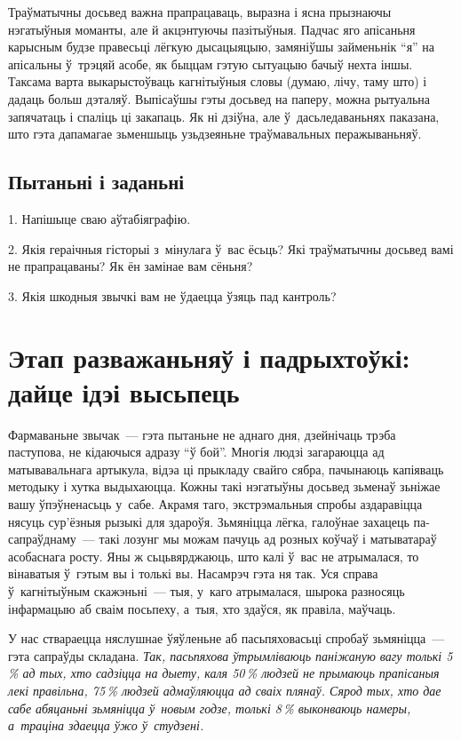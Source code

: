 Траўматычны досьвед важна прапрацаваць, выразна і ясна прызнаючы нэгатыўныя моманты, але й акцэнтуючы пазітыўныя. Падчас яго апісаньня карысным будзе правесьці лёгкую дысацыяцыю, замяніўшы займеньнік ``я'' на апісальны ў~трэцяй асобе, як быццам гэтую сытуацыю бачыў нехта іншы. Таксама варта выкарыстоўваць кагнітыўныя словы (думаю, лічу, таму што) і дадаць больш дэталяў. Выпісаўшы гэты досьвед на паперу, можна рытуальна запячатаць і спаліць ці закапаць. Як ні дзіўна, але ў~дасьледаваньнях паказана, што гэта дапамагае зьменшыць узьдзеяньне траўмавальных перажываньняў.

\subsection*{Пытаньні і заданьні}

1. Напішыце сваю аўтабіяграфію.

2. Якія гераічныя гісторыі з~мінулага ў~вас ёсьць? Які траўматычны досьвед вамі не прапрацаваны? Як ён замінае вам сёньня?

3. Якія шкодныя звычкі вам не ўдаецца ўзяць пад кантроль?


\section{Этап разважаньняў і падрыхтоўкі: дайце ідэі высьпець}

Фармаваньне звычак~--- гэта пытаньне не аднаго дня, дзейнічаць трэба паступова, не кідаючыся адразу ``ў бой''. Многія людзі загараюцца ад матывавальнага артыкула, відэа ці прыкладу свайго сябра, пачынаюць капіяваць методыку і хутка выдыхаюцца. Кожны такі нэгатыўны досьвед зьменаў зьніжае вашу ўпэўненасьць у~сабе. Акрамя таго, экстрэмальныя спробы аздаравіцца нясуць сур'ёзныя рызыкі для здароўя. Зьмяніцца лёгка, галоўнае захацець па-сапраўднаму~--- такі лозунг мы можам пачуць ад розных коўчаў і матыватараў асобаснага росту. Яны ж сьцьвярджаюць, што калі ў~вас не атрымалася, то вінаватыя ў~гэтым вы і толькі вы. Насамрэч гэта ня так. Уся справа ў~кагнітыўным скажэньні~--- тыя, у~каго атрымалася, шырока разносяць інфармацыю аб сваім посьпеху, а~тыя, хто здаўся, як правіла, маўчаць.

У нас ствараецца няслушнае ўяўленьне аб пасьпяховасьці спробаў зьмяніцца~--- гэта сапраўды складана. \emph{Так, пасьпяхова ўтрымліваюць паніжаную вагу толькі 5\,\% ад тых, хто садзіцца на дыету, каля 50\,\% людзей не прымаюць прапісаныя лекі правільна, 75\,\% людзей адмаўляюцца ад сваіх плянаў. Сярод тых, хто дае сабе абяцаньні зьмяніцца ў~новым годзе, толькі 8\,\% выконваюць намеры, а~траціна здаецца ўжо ў~студзені.}

